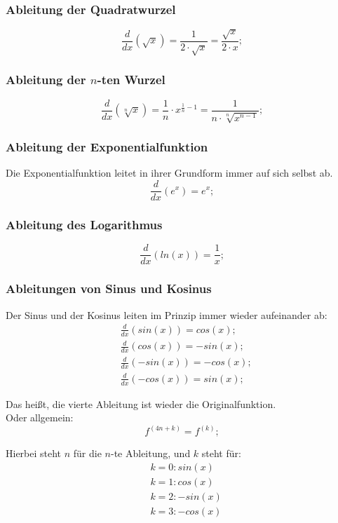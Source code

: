 \documentclass[a4paper]{article}
\begin{document}
\subsubsection{Ableitung der Quadratwurzel}
\[
	\frac{d}{dx} \left( \sqrt{x} \right) = \frac{1}{2 \cdot \sqrt{x}} = \frac{\sqrt{x}}{2 \cdot x} ;
\]

\subsubsection{Ableitung der $n$-ten Wurzel}
\[
	\frac{d}{dx} \left( \sqrt[n]{x} \right) = \frac{1}{n} \cdot x^{\frac{1}{n} - 1} = \frac{1}{n \cdot \sqrt[n]{x^{n - 1}}} ;
\]

\subsubsection{Ableitung der Exponentialfunktion}
Die Exponentialfunktion leitet in ihrer Grundform immer auf sich selbst ab.
\[
	\frac{d}{dx} \left( e^x \right) = e^x ;
\]

\subsubsection{Ableitung des Logarithmus}
\[
	\frac{d}{dx} \left( ln(x) \right) = \frac{1}{x} ;
\]

\subsubsection{Ableitungen von Sinus und Kosinus}
Der Sinus und der Kosinus leiten im Prinzip immer wieder aufeinander ab:
\begin{align*}
	& \frac{d}{dx} \left( sin(x) \right) = cos(x) ;
	\\
	& \frac{d}{dx} \left( cos(x) \right) = -sin(x) ;
	\\
	& \frac{d}{dx} \left( -sin(x) \right) = -cos(x) ;
	\\
	& \frac{d}{dx} \left( -cos(x) \right) = sin(x) ;
\end{align*}

Das heißt, die vierte Ableitung ist wieder die Originalfunktion.\\
Oder allgemein:
\[
	f^{(4n + k)} = f^{(k)} ;
\]

Hierbei steht $n$ für die $n$-te Ableitung, und $k$ steht für:
\begin{align*}
	& k = 0: sin(x)
	\\
	& k = 1: cos(x)
	\\
	& k = 2: -sin(x)
	\\
	& k = 3: -cos(x)
\end{align*}
\end{document}

